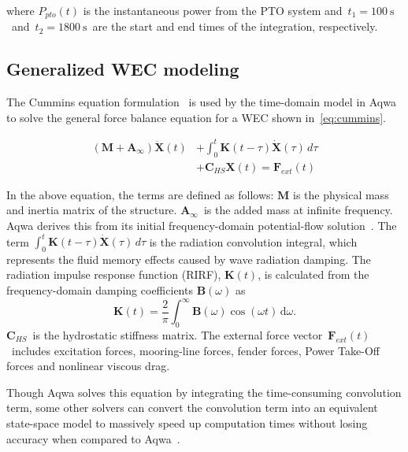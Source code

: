 \documentclass[10pt,journal,a4paper,twoside]{./IMEJ}
\begin{document}
where \(P_{pto}(t)\) is the instantaneous power from the PTO system and~\(t_1=100~\mathrm{s}\)~and~\(t_2=1800~\mathrm{s}\)~are the start and end times of the integration, respectively.
\subsection{Generalized WEC modeling}
The Cummins equation formulation~\cite{cummins1962} is used by the time-domain model in Aqwa to solve the general force balance equation for a WEC shown in~\eqref{eq:cummins}.

\begin{equation}
\begin{aligned}
\left(\mathbf{M}+\mathbf{A}_{\infty }\right)\ddot{\mathbf{X}}(t)
&+\int_{0}^{t}\mathbf{K}(t-\tau)\dot{\mathbf{X}}(\tau)\,d\tau \\
&+\mathbf{C}_{HS}\mathbf{X}(t)=\mathbf{F}_{ext}(t)
\end{aligned}
\label{eq:cummins}
\end{equation}

In the above equation, the terms are defined as follows:
\(\mathbf{M}\) is the physical mass and inertia matrix of the structure. \(\mathbf{A}_{\infty }\)~is the added mass at infinite frequency. Aqwa derives this from its initial frequency-domain potential-flow solution~\cite{jmse13122407}. The term \(\int_{0}^{t} \mathbf{K}(t-\tau) \dot{\mathbf{X}}(\tau)\,d\tau\) is the radiation convolution integral, which represents the fluid memory effects caused by wave radiation damping. The radiation impulse response function (RIRF), \(\mathbf{K}(t)\), is calculated from the frequency-domain damping coefficients \(\mathbf{B}(\omega)\) as
\begin{equation}
\mathbf{K}(t)=\frac{2}{\pi}\int_{0}^{\infty}\mathbf{B}(\omega)\cos(\omega t)\,\mathrm{d}\omega.
\label{eq:rirf}
\end{equation}
\(\mathbf{C}_{HS}\)~is the hydrostatic stiffness matrix. The external force vector~\(\mathbf{F}_{ext}(t)\)~includes excitation forces, mooring-line forces, fender forces, Power Take-Off forces and nonlinear viscous drag.
\par 
Though Aqwa solves this equation by integrating the time-consuming convolution term, some other solvers can convert the convolution term into an equivalent state-space model to massively speed up computation times without losing accuracy when compared to Aqwa~\cite{chen_fully_2024}.
\end{document}
